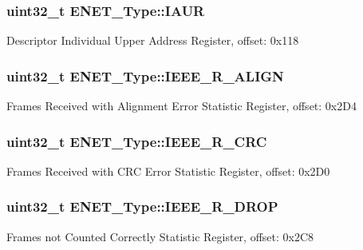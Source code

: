 \subsubsection[{\texorpdfstring{I\+A\+UR}{IAUR}}]{ uint32\+\_\+t E\+N\+E\+T\+\_\+\+Type\+::\+I\+A\+UR}\hypertarget{structENET__Type_aad5d329ac44b5fc9a777d7e5c553d824}{}\label{structENET__Type_aad5d329ac44b5fc9a777d7e5c553d824}
Descriptor Individual Upper Address Register, offset\+: 0x118 
\subsubsection[{\texorpdfstring{I\+E\+E\+E\+\_\+\+R\+\_\+\+A\+L\+I\+GN}{IEEE_R_ALIGN}}]{ uint32\+\_\+t E\+N\+E\+T\+\_\+\+Type\+::\+I\+E\+E\+E\+\_\+\+R\+\_\+\+A\+L\+I\+GN}\hypertarget{structENET__Type_a1bf3ce3082a18ca4d39d81628b0c0758}{}\label{structENET__Type_a1bf3ce3082a18ca4d39d81628b0c0758}
Frames Received with Alignment Error Statistic Register, offset\+: 0x2\+D4 
\subsubsection[{\texorpdfstring{I\+E\+E\+E\+\_\+\+R\+\_\+\+C\+RC}{IEEE_R_CRC}}]{ uint32\+\_\+t E\+N\+E\+T\+\_\+\+Type\+::\+I\+E\+E\+E\+\_\+\+R\+\_\+\+C\+RC}\hypertarget{structENET__Type_a08098bd6302b0fe857141cdb2be182e5}{}\label{structENET__Type_a08098bd6302b0fe857141cdb2be182e5}
Frames Received with C\+RC Error Statistic Register, offset\+: 0x2\+D0 
\subsubsection[{\texorpdfstring{I\+E\+E\+E\+\_\+\+R\+\_\+\+D\+R\+OP}{IEEE_R_DROP}}]{ uint32\+\_\+t E\+N\+E\+T\+\_\+\+Type\+::\+I\+E\+E\+E\+\_\+\+R\+\_\+\+D\+R\+OP}\hypertarget{structENET__Type_a7bef15c48d3a9cb1ff5d2c7bd5f99be2}{}\label{structENET__Type_a7bef15c48d3a9cb1ff5d2c7bd5f99be2}
Frames not Counted Correctly Statistic Register, offset\+: 0x2\+C8 
